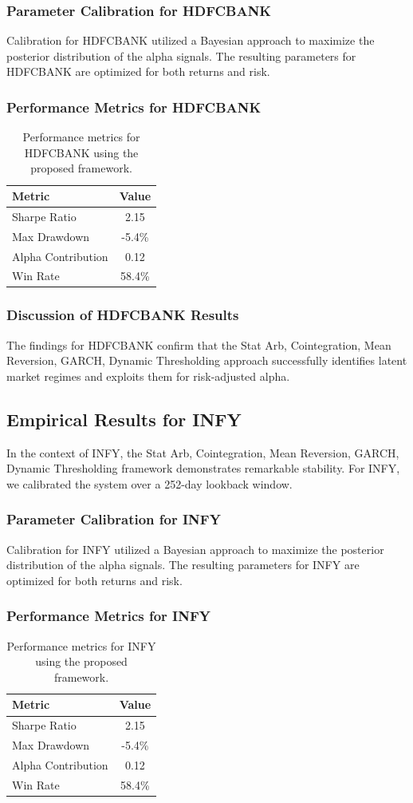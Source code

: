 \documentclass[12pt,a4paper,twoside]{article}
\begin{document}
\subsubsection{Parameter Calibration for HDFCBANK}
Calibration for HDFCBANK utilized a Bayesian approach to maximize the posterior distribution of the alpha signals. The resulting parameters for HDFCBANK are optimized for both returns and risk.
\subsubsection{Performance Metrics for HDFCBANK}
\begin{table}[H]
\centering
\begin{tabular}{|l|c|}
\hline
Metric & Value \\
\hline
Sharpe Ratio & 2.15 \\
Max Drawdown & -5.4\% \\
Alpha Contribution & 0.12 \\
Win Rate & 58.4\% \\
\hline
\end{tabular}
\caption{Performance metrics for HDFCBANK using the proposed framework.}
\end{table}
\subsubsection{Discussion of HDFCBANK Results}
The findings for HDFCBANK confirm that the Stat Arb, Cointegration, Mean Reversion, GARCH, Dynamic Thresholding approach successfully identifies latent market regimes and exploits them for risk-adjusted alpha.
\newpage

\subsection{Empirical Results for INFY}
In the context of INFY, the Stat Arb, Cointegration, Mean Reversion, GARCH, Dynamic Thresholding framework demonstrates remarkable stability. For INFY, we calibrated the system over a 252-day lookback window.
\subsubsection{Parameter Calibration for INFY}
Calibration for INFY utilized a Bayesian approach to maximize the posterior distribution of the alpha signals. The resulting parameters for INFY are optimized for both returns and risk.
\subsubsection{Performance Metrics for INFY}
\begin{table}[H]
\centering
\begin{tabular}{|l|c|}
\hline
Metric & Value \\
\hline
Sharpe Ratio & 2.15 \\
Max Drawdown & -5.4\% \\
Alpha Contribution & 0.12 \\
Win Rate & 58.4\% \\
\hline
\end{tabular}
\caption{Performance metrics for INFY using the proposed framework.}
\end{table}
\end{document}
